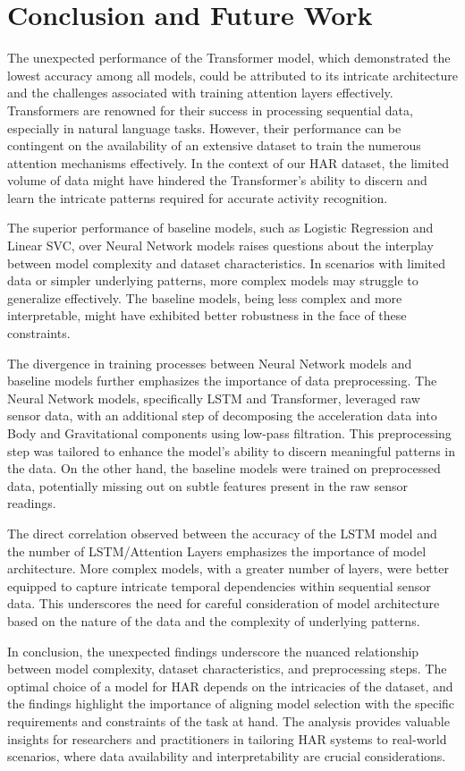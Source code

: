 \documentclass[conference]{IEEEtran}
\begin{document}
\section{Conclusion and Future Work}
The unexpected performance of the Transformer model, which demonstrated the lowest accuracy among all models, could be attributed to its intricate architecture and the challenges associated with training attention layers effectively. Transformers are renowned for their success in processing sequential data, especially in natural language tasks. However, their performance can be contingent on the availability of an extensive dataset to train the numerous attention mechanisms effectively. In the context of our HAR dataset, the limited volume of data might have hindered the Transformer's ability to discern and learn the intricate patterns required for accurate activity recognition.

The superior performance of baseline models, such as Logistic Regression and Linear SVC, over Neural Network models raises questions about the interplay between model complexity and dataset characteristics. In scenarios with limited data or simpler underlying patterns, more complex models may struggle to generalize effectively. The baseline models, being less complex and more interpretable, might have exhibited better robustness in the face of these constraints.

The divergence in training processes between Neural Network models and baseline models further emphasizes the importance of data preprocessing. The Neural Network models, specifically LSTM and Transformer, leveraged raw sensor data, with an additional step of decomposing the acceleration data into Body and Gravitational components using low-pass filtration. This preprocessing step was tailored to enhance the model's ability to discern meaningful patterns in the data. On the other hand, the baseline models were trained on preprocessed data, potentially missing out on subtle features present in the raw sensor readings.

The direct correlation observed between the accuracy of the LSTM model and the number of LSTM/Attention Layers emphasizes the importance of model architecture. More complex models, with a greater number of layers, were better equipped to capture intricate temporal dependencies within sequential sensor data. This underscores the need for careful consideration of model architecture based on the nature of the data and the complexity of underlying patterns.

In conclusion, the unexpected findings underscore the nuanced relationship between model complexity, dataset characteristics, and preprocessing steps. The optimal choice of a model for HAR depends on the intricacies of the dataset, and the findings highlight the importance of aligning model selection with the specific requirements and constraints of the task at hand. The analysis provides valuable insights for researchers and practitioners in tailoring HAR systems to real-world scenarios, where data availability and interpretability are crucial considerations.
\end{document}
